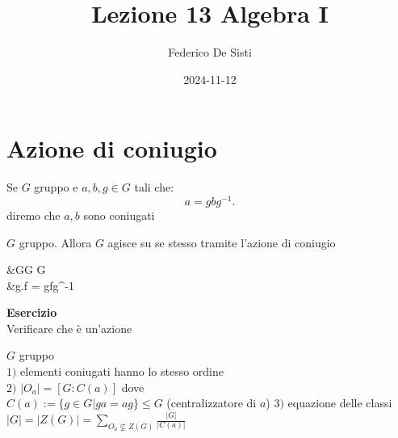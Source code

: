 \documentclass[12px]{article}
\title{Lezione 13 Algebra I}
\date{2024-11-12}
\author{Federico De Sisti}
\begin{document}
	\maketitle
	\newpage
	\section{Azione di coniugio}
	\begin{defi}
		Se $G$ gruppo e $a,b,g\in G$ tali che:
		 \[
			 a = gbg^{-1}
		.\] 
		diremo che $a,b$ sono coniugati
	\end{defi}
	\begin{defi}
		$G$ gruppo. Allora $G$ agisce su se stesso tramite l'azione di coniugio\\
		\begin{aligned}
			&G\times G \rightarrow G\\
			&g.f = gfg^{-1}
		\end{aligned}
	\end{defi}
	\textbf{Esercizio}\\
	Verificare che è un'azione\\
	\begin{teo}
		$G$ gruppo\\
		$1)$ elementi coniugati hanno lo stesso ordine\\
		$2)$ $|O_a| = [G:C(a)]$ dove\\
		$C(a):=\{g\in G|ga = ag\}\leq G$ (centralizzatore di  $a$)
		$3)$ equazione delle classi\\
		$\displaystyle|G| = |Z(G)| = \sum_{O_a\not\subseteq Z(G)}\frac{|G|}{|C(a)|}$
	\end{teo}
\end{document}
